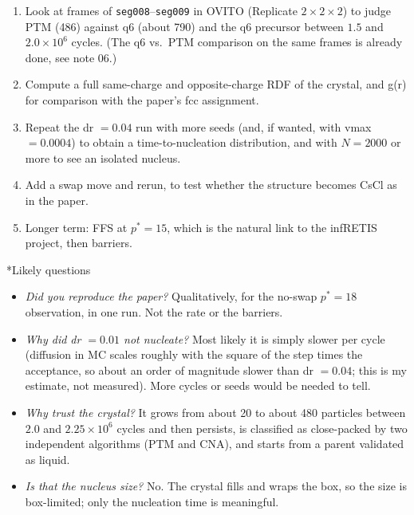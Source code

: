 \documentclass[10.5pt,a4paper]{article}
\makeatletter
\renewcommand\subsection{\@startsection{subsection}{2}{0pt}{1.0em plus .2em minus .1em}{0.3em}{\large\bfseries\color{accent}}}
\newcommand{\ps}{p^{*}}
\makeatother
\begin{document}
\begin{enumerate}
\item Look at frames of \texttt{seg008}--\texttt{seg009} in OVITO (Replicate $2\times2\times2$) to judge PTM (486) against q6 (about 790) and the q6 precursor between $1.5$ and $2.0\times10^{6}$ cycles. (The q6 vs.\ PTM comparison on the same frames is already done, see note 06.)
\item Compute a full same-charge and opposite-charge RDF of the crystal, and g(r) for comparison with the paper's fcc assignment.
\item Repeat the dr $=0.04$ run with more seeds (and, if wanted, with vmax $=0.0004$) to obtain a time-to-nucleation distribution, and with $N=2000$ or more to see an isolated nucleus.
\item Add a swap move and rerun, to test whether the structure becomes CsCl as in the paper.
\item Longer term: FFS at $\ps=15$, which is the natural link to the infRETIS project, then barriers.
\end{enumerate}

\subsection*{Likely questions}
\begin{itemize}
\item \emph{Did you reproduce the paper?} Qualitatively, for the no-swap $\ps=18$ observation, in one run. Not the rate or the barriers.
\item \emph{Why did dr $=0.01$ not nucleate?} Most likely it is simply slower per cycle (diffusion in MC scales roughly with the square of the step times the acceptance, so about an order of magnitude slower than dr $=0.04$; this is my estimate, not measured). More cycles or seeds would be needed to tell.
\item \emph{Why trust the crystal?} It grows from about 20 to about 480 particles between $2.0$ and $2.25\times10^{6}$ cycles and then persists, is classified as close-packed by two independent algorithms (PTM and CNA), and starts from a parent validated as liquid.
\item \emph{Is that the nucleus size?} No. The crystal fills and wraps the box, so the size is box-limited; only the nucleation time is meaningful.
\end{itemize}
\end{document}
